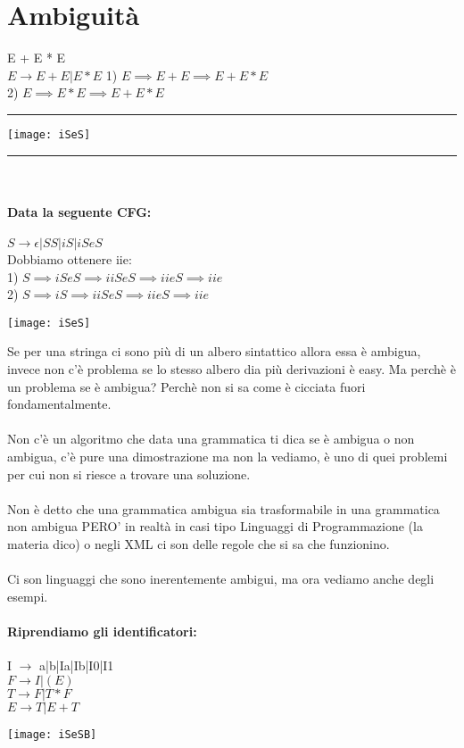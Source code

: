 \documentclass[12pt, a4paper, openany, oneside]{book}
\begin{document}
\section{Ambiguità}
E + E * E \\
$E \to E + E | E * E$
1) $E \implies E + E \implies E + E * E$ \\
2) $E \implies E * E \implies E + E * E$
\\
{\color{black} \rule{\linewidth}{0.3mm} }
\begin{center}
\texttt{[image: iSeS]}
\end{center}
{\color{black} \rule{\linewidth}{0.3mm} }
\\
\paragraph{Data la seguente CFG: } $S \to \epsilon|SS|iS|iSeS$ \\
Dobbiamo ottenere iie: \\
1) $S \implies iSeS \implies iiSeS \implies iieS \implies iie$ \\
2) $S \implies iS \implies iiSeS \implies iieS \implies iie$
\begin{center}
\texttt{[image: iSeS]}
\end{center}
Se per una stringa ci sono più di un albero sintattico allora essa è ambigua, 
invece non c'è problema se lo stesso albero dia più derivazioni è easy. Ma
perchè è un problema se è ambigua? Perchè non si sa come è cicciata fuori 
fondamentalmente.\\ \\
Non c'è un algoritmo che data una grammatica ti dica se è ambigua o non ambigua,
c'è pure una dimostrazione ma non la vediamo, è uno di quei problemi per cui
non si riesce a trovare una soluzione.\\ \\ Non è detto che una grammatica ambigua
sia trasformabile in una grammatica non ambigua PERO' in realtà in casi tipo 
Linguaggi di Programmazione (la materia dico) o negli XML ci son delle regole
che si sa che funzionino.\\ \\
Ci son linguaggi che sono inerentemente ambigui, ma ora vediamo anche degli esempi.
\paragraph{Riprendiamo gli identificatori: } I $\to$ a|b|Ia|Ib|I0|I1 \\
$F \to I | (E)$ \\
$T \to F | T * F$ \\
$E \to T | E + T$\\
\begin{center}
\texttt{[image: iSeSB]}
\end{center}
\end{document}
